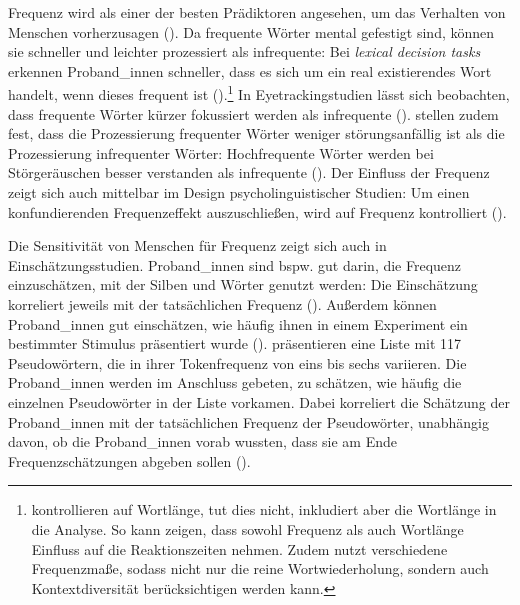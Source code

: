 Frequenz wird als einer der besten Prädiktoren angesehen, um das Verhalten von Menschen vorherzusagen (\cite[55]{Divjak.2015}). Da frequente Wörter mental gefestigt sind, können sie schneller und leichter prozessiert als infrequente: Bei \textit{lexical decision tasks} erkennen Proband\_innen schneller, dass es sich um ein real existierendes Wort handelt, wenn dieses frequent ist (\cites[489--491]{Rubenstein.1970}[150--152]{Whaley.1978}).\footnote{\textcite[488--489]{Rubenstein.1970} kontrollieren auf Wortlänge, \textcite[144--148]{Whaley.1978} tut dies nicht,  inkludiert aber die Wortlänge in die Analyse. So kann \textcite[148--152]{Whaley.1978} zeigen, dass sowohl Frequenz als auch Wortlänge Einfluss auf die Reaktionszeiten nehmen. Zudem nutzt \textcite[146]{Whaley.1978} verschiedene Frequenzmaße, sodass nicht nur die reine Wortwiederholung, sondern auch Kontextdiversität berücksichtigen werden kann.} In Eyetrackingstudien lässt sich beobachten, dass frequente Wörter kürzer fokussiert werden als infrequente (\cite{Rayner.1986}). \textcite[56]{Divjak.2015} stellen zudem fest, dass die Prozessierung frequenter Wörter weniger störungsanfällig ist als die Prozessierung infrequenter Wörter: Hochfrequente Wörter werden bei Störgeräuschen besser verstanden als infrequente (\cite{Pollack.1959}). Der Einfluss der Frequenz zeigt sich auch mittelbar im Design psycholinguistischer Studien: Um einen konfundierenden Frequenzeffekt auszuschließen, wird auf Frequenz kontrolliert (\cite[54]{Divjak.2015}). 



Die Sensitivität von Menschen für Frequenz zeigt sich auch in Einschätzungsstudien. Proband\_innen sind bspw. gut darin, die Frequenz einzuschätzen, mit der Silben und Wörter genutzt werden: Die Einschätzung korreliert jeweils mit der tatsächlichen Frequenz (\cite{Shapiro.1969, Rubin.1974}). Außerdem können Pro\-\mbox{band\_in}\-nen  gut einschätzen, wie häufig ihnen in einem Experiment ein bestimmter Stimulus präsentiert wurde (\cite{Hasher.1984}). \textcite[323]{Flexser.1975} präsentieren eine Liste mit 117 Pseudowörtern, die in ihrer Tokenfrequenz von eins bis sechs variieren. Die Proband\_innen werden im Anschluss gebeten, zu schätzen, wie häufig die einzelnen Pseudowörter in der Liste vorkamen. Dabei korreliert die Schätzung der Proband\_innen mit der tatsächlichen Frequenz der Pseudowörter, unabhängig davon, ob die Proband\_innen vorab wussten, dass sie am Ende Frequenzschätzungen abgeben sollen (\cite[323--324]{Flexser.1975}).

 

